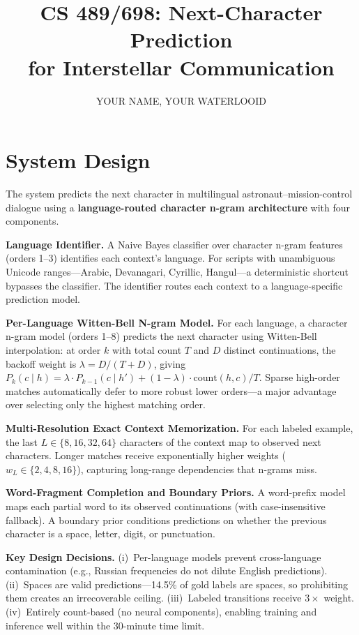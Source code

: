 \documentclass[11pt]{article}
\title{\vspace{-1.5em}CS 489/698: Next-Character Prediction \\ for Interstellar Communication\vspace{-0.5em}}
\author{YOUR NAME, YOUR WATERLOOID}
\date{}
\begin{document}
\maketitle
\vspace{-2em}

\section{System Design}

The system predicts the next character in multilingual astronaut--mission-control dialogue using a \textbf{language-routed character n-gram architecture} with four components.

\textbf{Language Identifier.}
A Naive Bayes classifier over character n-gram features (orders 1--3) identifies each context's language. For scripts with unambiguous Unicode ranges---Arabic, Devanagari, Cyrillic, Hangul---a deterministic shortcut bypasses the classifier. The identifier routes each context to a language-specific prediction model.

\textbf{Per-Language Witten-Bell N-gram Model.}
For each language, a character n-gram model (orders 1--8) predicts the next character using Witten-Bell interpolation: at order $k$ with total count $T$ and $D$ distinct continuations, the backoff weight is $\lambda = D/(T+D)$, giving $P_k(c \mid h) = \lambda \cdot P_{k-1}(c \mid h') + (1-\lambda) \cdot \text{count}(h,c)/T$. Sparse high-order matches automatically defer to more robust lower orders---a major advantage over selecting only the highest matching order.

\textbf{Multi-Resolution Exact Context Memorization.}
For each labeled example, the last $L \in \{8, 16, 32, 64\}$ characters of the context map to observed next characters. Longer matches receive exponentially higher weights ($w_L \in \{2, 4, 8, 16\}$), capturing long-range dependencies that n-grams miss.

\textbf{Word-Fragment Completion and Boundary Priors.}
A word-prefix model maps each partial word to its observed continuations (with case-insensitive fallback). A boundary prior conditions predictions on whether the previous character is a space, letter, digit, or punctuation.

\textbf{Key Design Decisions.}
(i)~Per-language models prevent cross-language contamination (e.g., Russian frequencies do not dilute English predictions).
(ii)~Spaces are valid predictions---14.5\% of gold labels are spaces, so prohibiting them creates an irrecoverable ceiling.
(iii)~Labeled transitions receive $3\times$ weight.
(iv)~Entirely count-based (no neural components), enabling training and inference well within the 30-minute time limit.
\end{document}
